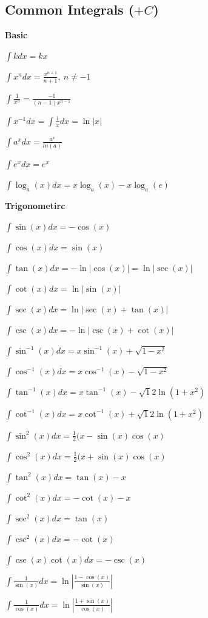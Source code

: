 \documentclass[8pt,a4paper]{extarticle}     %
\theoremstyle{definition}
\theoremstyle{definition}
\theoremstyle{definition}
\begin{document}
\begin{multicols}{4}
\subsection{Common Integrals ($+C$)}
\begin{bulletlist}
	\item [] \textbf{Basic}
	\item $\int kdx = kx$
	\item $\int x^ndx = \frac{x^{n+1}}{n+1}, \ n\neq-1$
	\item $\int \frac{1}{x^n} = \frac{-1}{(n-1)x^{n-1}}$
	\item $\int x^{-1}dx = \int \frac{1}{x}dx = \ln|x|$
	\item $\int a^x dx = \frac{a^x}{ln(a)}$
	\item $\int e^x dx = e^x$
	\item $\int \log_a(x)dx = x\log_a(x)-x\log_a(e)$
	\item [] \textbf{Trigonometirc}
	\item $\int \sin(x)dx = -\cos(x)$
	\item $\int \cos(x)dx = \sin(x)$
	\item $\int \tan(x)dx = -\ln|\cos(x)| = \ln|\sec(x)|$
	\item $\int \cot(x)dx = \ln|\sin(x)|$
	\item $\int \sec(x)dx = \ln|\sec(x)+\tan(x)|$
	\item $\int \csc(x)dx = -\ln|\csc(x)+\cot(x)|$
	\item $\int \sin^{-1}(x)dx = x\sin^{-1}(x)+\sqrt{1-x^2}$
	\item $\int \cos^{-1}(x)dx = x\cos^{-1}(x)-\sqrt{1-x^2}$
	\item $\int \tan^{-1}(x)dx = x\tan^{-1}(x)-\sqrt{1}{2}\ln(1+x^2)$
	\item $\int \cot^{-1}(x)dx = x\cot^{-1}(x)+\sqrt{1}{2}\ln(1+x^2)$
	\item $\int \sin^2(x)dx = \frac{1}{2}(x-\sin(x)\cos(x)$
	\item $\int \cos^2(x)dx = \frac{1}{2}(x+\sin(x)\cos(x)$
	\item $\int \tan^2(x)dx = \tan(x)-x$
	\item $\int \cot^2(x)dx = -\cot(x)-x$
	\item $\int \sec^2(x)dx = \tan(x)$
	\item $\int \csc^2(x)dx = -\cot(x)$
	\item $\int \csc(x)\cot(x)dx = -\csc(x)$
	\item $\int \frac{1}{\sin(x)}dx = \ln\left|\frac{1-\cos(x)}{\sin(x)}\right|$
	\item $\int \frac{1}{\cos(x)}dx = \ln\left|\frac{1+\sin(x)}{\cos(x)}\right|$

\end{bulletlist}
\end{multicols}
\end{document}
